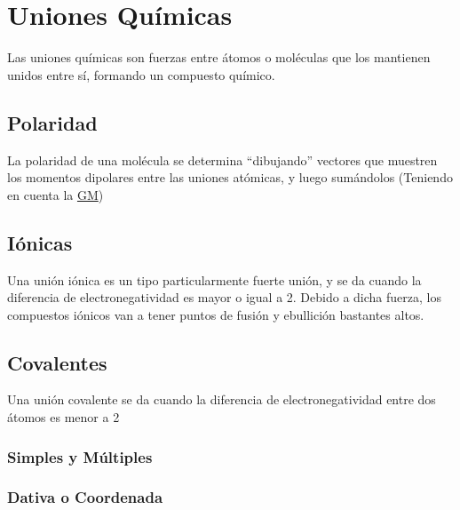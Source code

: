 \documentclass[../teoria.root.tex]{subfiles}
\begin{document}
\section{Uniones Químicas}
Las uniones químicas son fuerzas entre átomos o moléculas que los mantienen unidos entre sí, formando un compuesto químico.

\subsection{Polaridad}
La polaridad de una molécula se determina ``dibujando'' vectores que muestren los momentos dipolares entre las uniones atómicas, y luego sumándolos (Teniendo en cuenta la \hyperref[sec:trepev]{GM})

\subsection{Iónicas}
Una unión iónica es un tipo particularmente fuerte unión, y se da cuando la diferencia de electronegatividad es mayor o igual a 2. Debido a dicha fuerza, los compuestos iónicos van a tener puntos de fusión y ebullición bastantes altos.

\subsection{Covalentes}
Una unión covalente se da cuando la diferencia de electronegatividad entre dos átomos es menor a 2

\subsubsection{Simples y Múltiples}

\subsubsection{Dativa o Coordenada}
\end{document}
